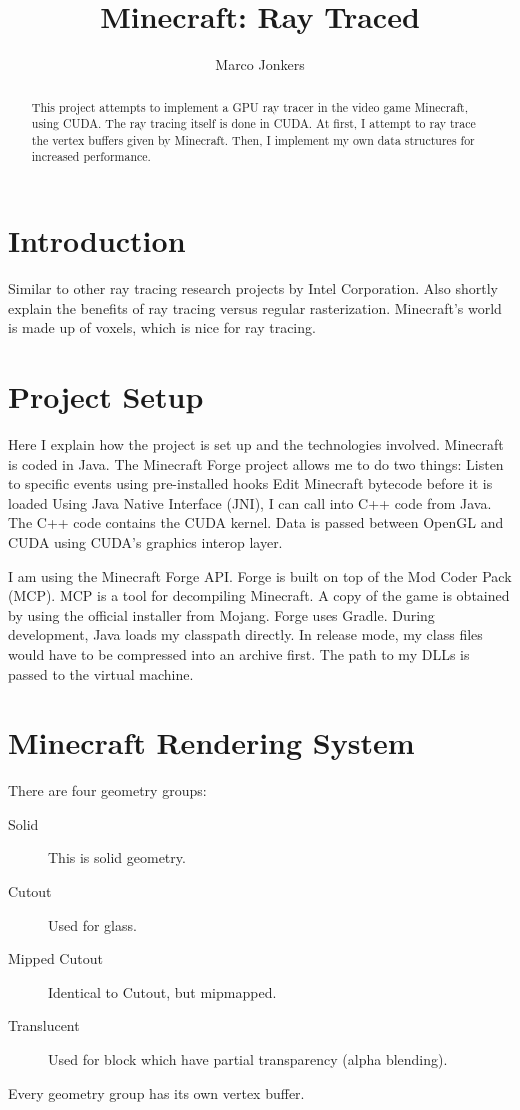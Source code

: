 \documentclass[]{article}
\title{Minecraft: Ray Traced}
\author{Marco Jonkers}
\begin{document}
\maketitle

\begin{abstract}
This project attempts to implement a GPU ray tracer in the video game Minecraft, using CUDA.
The ray tracing itself is done in CUDA. At first, I attempt to ray trace the vertex buffers given by Minecraft. Then, I implement my own data structures for increased performance.
\end{abstract}

\section{Introduction}
Similar to other ray tracing research projects by Intel Corporation.
Also shortly explain the benefits of ray tracing versus regular rasterization.
Minecraft's world is made up of voxels, which is nice for ray tracing.

\section{Project Setup}
Here I explain how the project is set up and the technologies involved.
Minecraft is coded in Java.
The Minecraft Forge project allows me to do two things:
  Listen to specific events using pre-installed hooks
  Edit Minecraft bytecode before it is loaded
Using Java Native Interface (JNI), I can call into C++ code from Java.
The C++ code contains the CUDA kernel.
Data is passed between OpenGL and CUDA using CUDA's graphics interop layer.

I am using the Minecraft Forge API.
Forge is built on top of the Mod Coder Pack (MCP).
MCP is a tool for decompiling Minecraft.
A copy of the game is obtained by using the official installer from Mojang.
Forge uses Gradle.
During development, Java loads my classpath directly.
In release mode, my class files would have to be compressed into an archive first.
The path to my DLLs is passed to the virtual machine.

\section{Minecraft Rendering System}
There are four geometry groups:
\begin{description}
  \item[Solid] This is solid geometry.
  \item[Cutout] Used for glass.
  \item[Mipped Cutout] Identical to Cutout, but mipmapped.
  \item[Translucent] Used for block which have partial transparency (alpha blending).
\end{description}
Every geometry group has its own vertex buffer.
\end{document}
